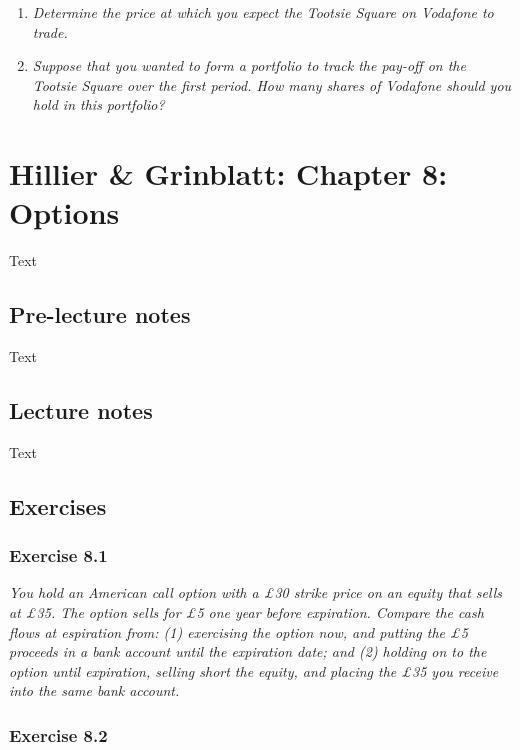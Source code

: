 \documentclass[]{book}
\theoremstyle{definition}
\theoremstyle{definition}
\theoremstyle{remark}
\begin{document}
\begin{enumerate}
\def\labelenumi{\alph{enumi}.}
\item
  \emph{Determine the price at which you expect the Tootsie Square on
  Vodafone to trade.} \citep[p.236]{book}
\item
  \emph{Suppose that you wanted to form a portfolio to track the pay-off
  on the Tootsie Square over the first period. How many shares of
  Vodafone should you hold in this portfolio?} \citep[p.236]{book}
\end{enumerate}

\chapter{Hillier \& Grinblatt: Chapter 8:
Options}\label{hillier-grinblatt-chapter-8-options}

Text

\section{Pre-lecture notes}\label{pre-lecture-notes-7}

Text

\section{Lecture notes}\label{lecture-notes-7}

Text

\section{Exercises}\label{exercises-7}

\subsection{Exercise 8.1}\label{exercise-8.1}

\emph{You hold an American call option with a £30 strike price on an
equity that sells at £35. The option sells for £5 one year before
expiration. Compare the cash flows at espiration from: (1) exercising
the option now, and putting the £5 proceeds in a bank account until the
expiration date; and (2) holding on to the option until expiration,
selling short the equity, and placing the £35 you receive into the same
bank account.} \citep[p.271]{book}

\subsection{Exercise 8.2}\label{exercise-8.2}
\end{document}
